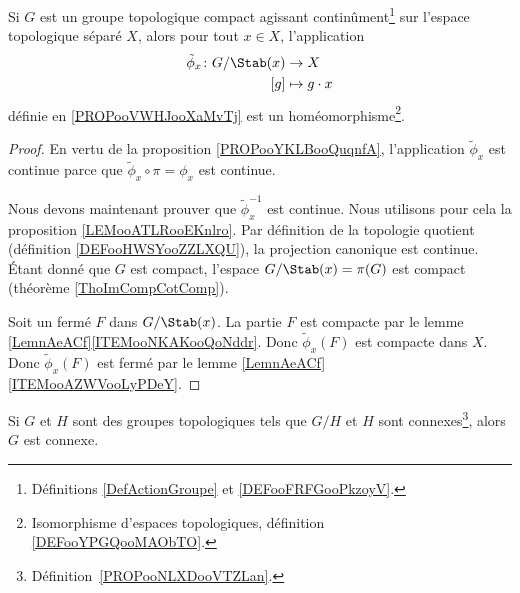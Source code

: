 \begin{theorem}     \label{ThojrLKZk}
	Si \( G\) est un groupe topologique compact agissant continûment\footnote{Définitions \ref{DefActionGroupe} et \ref{DEFooFRFGooPkzoyV}.} sur l'espace topologique séparé \( X\), alors pour tout \( x\in X\), l'application
	\begin{equation}
		\begin{aligned}
			\tilde \phi_x\colon G/\Stab(x) & \to X            \\
			[g]                            & \mapsto g\cdot x
		\end{aligned}
	\end{equation}
	définie en \ref{PROPooVWHJooXaMvTj} est un homéomorphisme\footnote{Isomorphisme d'espaces topologiques, définition \ref{DEFooYPGQooMAObTO}.}.
\end{theorem}

\begin{proof}
	En vertu de la proposition \ref{PROPooYKLBooQuqnfA}, l'application \( \tilde \phi_x\) est continue parce que \( \tilde \phi_x\circ\pi=\phi_x\) est continue.

	Nous devons maintenant prouver que \( \tilde \phi_x^{-1}\) est continue. Nous utilisons pour cela la proposition \ref{LEMooATLRooEKnlro}. Par définition de la topologie quotient (définition \ref{DEFooHWSYooZZLXQU}), la projection canonique est continue. Étant donné que \( G\) est compact, l'espace \( G/\Stab(x)=\pi(G)\) est compact (théorème \ref{ThoImCompCotComp}).

	Soit un fermé \( F\) dans \( G/\Stab(x)\). La partie \( F\) est compacte par le lemme \ref{LemnAeACf}\ref{ITEMooNKAKooQoNddr}. Donc \( \tilde \phi_x(F)\) est compacte dans \( X\). Donc \( \tilde \phi_x(F)\) est fermé par le lemme \ref{LemnAeACf}\ref{ITEMooAZWVooLyPDeY}.
\end{proof}

\begin{lemma}       \label{LemkLRAet}
	Si \( G\) et \( H\) sont des groupes topologiques tels que \( G/H\) et \( H\) sont connexes\footnote{Définition~\ref{PROPooNLXDooVTZLan}.}, alors \( G\) est connexe.
\end{lemma}

